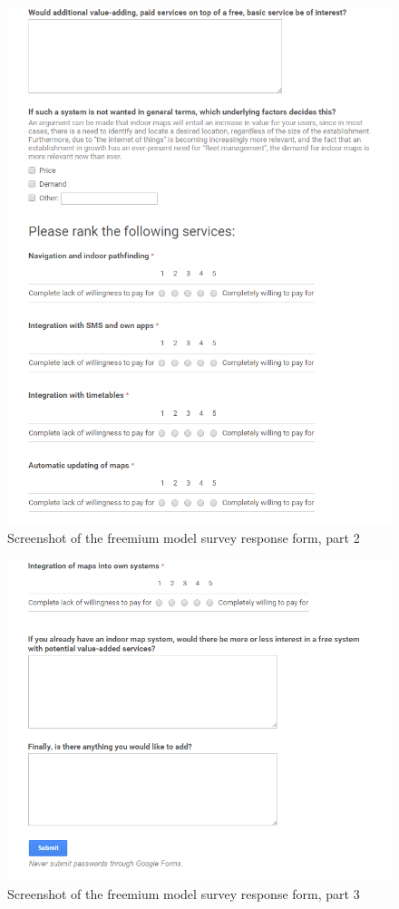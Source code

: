 \begin{figure}
\centering
\includegraphics[width=\linewidth]{figs/questionaire2.PNG}
\caption{Screenshot of the freemium model survey response form, part 2}
\label{fig:surveyform2}
\end{figure}

\begin{figure}
\centering
\includegraphics[width=\linewidth]{figs/questionaire3.PNG}
\caption{Screenshot of the freemium model survey response form, part 3}
\label{fig:surveyform3}
\end{figure}